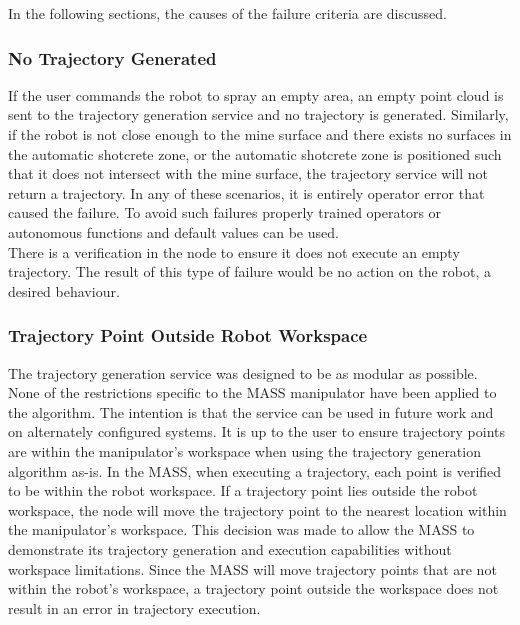 In the following sections, the causes of the failure criteria are discussed.

\subsubsection{No Trajectory Generated}

If the user commands the robot to spray an empty area, an empty point cloud is sent to the trajectory generation service and no trajectory is generated. Similarly, if the robot is not close enough to the mine surface and there exists no surfaces in the automatic shotcrete zone, or the automatic shotcrete zone is positioned such that it does not intersect with the mine surface, the trajectory service will not return a trajectory. In any of these scenarios, it is entirely operator error that caused the failure. To avoid such failures properly trained operators or autonomous functions and default values can be used.\\

There is a verification in the  node to ensure it does not execute an empty trajectory. The result of this type of failure would be no action on the robot, a desired behaviour.

\subsubsection{Trajectory Point Outside Robot Workspace}

The trajectory generation service was designed to be as modular as possible. None of the restrictions specific to the MASS manipulator have been applied to the algorithm. The intention is that the service can be used in future work and on alternately configured systems. It is up to the user to ensure trajectory points are within the manipulator's workspace when using the trajectory generation algorithm as-is. In the MASS, when executing a trajectory, each point is verified to be within the robot workspace. If a trajectory point lies outside the robot workspace, the  node will move the trajectory point to the nearest location within the manipulator's workspace. This decision was made to allow the MASS to demonstrate its trajectory generation and execution capabilities without workspace limitations. Since the MASS will move trajectory points that are not within the robot's workspace, a trajectory point outside the workspace does not result in an error in trajectory execution.\\

